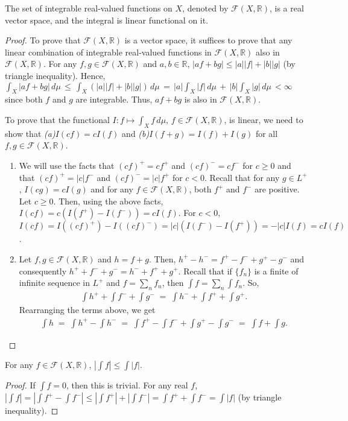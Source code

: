 \documentclass[a4paper,english,12pt]{article}
\begin{document}
\begin{prop} The set of integrable real-valued functions on $X$, denoted by $\mathcal{F}(X,\mathbb{R})$, is a real vector space, and the integral is linear functional on it.
\end{prop}	
\begin{proof} To prove that $\mathcal{F}(X,\mathbb{R})$ is a vector space, it suffices to prove that any linear combination of integrable real-valued functions in $\mathcal{F}(X,\mathbb{R})$ also in $\mathcal{F}(X,\mathbb{R})$. For any $f,g\in \mathcal{F}(X,\mathbb{R})$ and $a,b\in\mathbb{R}$, $|af+bg|\leqslant|a||f|+|b||g|$ (by triangle inequality). Hence, $\int_X|af+bg|\,d\mu\,\leqslant\,\int_X(|a||f|+|b||g|)\,d\mu\,=\,|a|\int_X|f|\,d\mu\,+\,|b|\int_X|g|\,d\mu\,<\infty$ since both $f$ and $g$ are integrable. Thus, $af+bg$ is also in $\mathcal{F}(X,\mathbb{R})$. 

To prove that the functional $I:f\longmapsto \int_X f\,d\mu,\,f\in \mathcal{F}(X,\mathbb{R})$, is linear, we need to show that \textit{(a)}$I(cf)=cI(f)$ and \textit{(b)}$I(f+g)=I(f)+I(g)$ for all $f,g\in \mathcal{F}(X,\mathbb{R})$. 
\begin{enumerate}[\itshape(a)]
\item We will use the facts that $(cf)^+=cf^+$ and $(cf)^-=cf^-$ for $c\geqslant 0$ and that $(cf)^+=|c|f^-$ and $(cf)^-=|c|f^+$ for $c<0$. Recall that for any $g\in L^+$, $I(cg)=cI(g)$ and for any $f\in \mathcal{F}(X,\mathbb{R})$, both $f^+$ and $f^-$ are positive. Let $c\geqslant 0$. Then, using the above facts, $I(cf)=c(I(f^+)-I(f^-))= cI(f)$. For $c<0$, $I(cf)=I((cf)^+)-I((cf)^-)=|c|(I(f^-)-I(f^+))=-|c|I(f)=cI(f)$.
\item Let $f,g\in \mathcal{F}(X,\mathbb{R})$ and $h=f+g$. Then, $h^+-h^-=f^+-f^-+g^+-g^-$ and consequently $h^++f^-+g^-=h^-+f^++g^+$. Recall that if $\{f_n\}$ is a finite of infinite sequence in $L^+$ and $f=\sum_nf_n$, then $\int f=\sum_n\int f_n$. So, 
	\begin{align*}
		\int h^+ + \int f^- + \int g^- \;=\;\int h^- + \int f^+ + \int g^+.
	\end{align*}
Rearranging the terms above, we get
	\begin{align*}
		\int h\;=\;\int h^+-\int h^-\;=\;\int f^+-\int f^-+\int g^+-\int g^-\;=\;\int f+\int g.
	\end{align*}
\end{enumerate}
\end{proof}

\begin{prop}For any $f\in \mathcal{F}(X,\mathbb{R})$, $|\int f|\leqslant \int |f|$.
\label{int_mod}
\end{prop}
\begin{proof}If $\int f=0$, then this is trivial. For any real $f$, $|\int f|=|\int f^+-\int f^-|\leqslant |\int f^+| + |\int f^-|=\int f^+ + \int f^- = \int |f|$ (by triangle inequality).
\end{proof}
\end{document}
